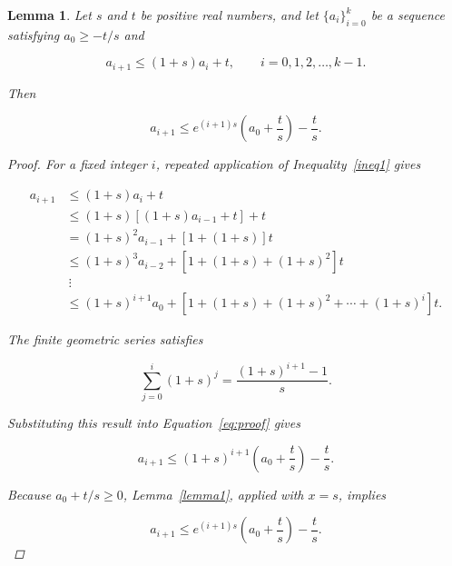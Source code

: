 \documentclass[a4paper]{article}
\newtheorem{lemma}{Lemma}
\begin{document}
\begin{lemma}\label{lemma2}
Let $s$ and $t$ be positive real numbers, and let $\{a_i\}_{i=0}^{k}$ be a sequence satisfying $a_0\geq -t/s$ and

\begin{equation}\label{ineq1}
a_{i+1}\leq (1+s)a_i+t, \qquad i=0,1,2,\ldots,k-1.
\end{equation}

Then

\begin{equation*}
a_{i+1}\leq e^{(i+1)s}\left(a_0+\frac{t}{s}\right)-\frac{t}{s}.
\end{equation*}

\begin{proof}
For a fixed integer $i$, repeated application of Inequality~\ref{ineq1} gives

\begin{equation}\label{eq:proof}
\begin{split}
a_{i+1}
&\leq (1+s)a_i+t\\
&\leq (1+s)[(1+s)a_{i-1}+t]+t\\
&=(1+s)^2a_{i-1}+[1+(1+s)]t\\
&\leq (1+s)^3a_{i-2}+[1+(1+s)+(1+s)^2]t\\
&\ \vdots\\
&\leq (1+s)^{i+1}a_0+[1+(1+s)+(1+s)^2+\cdots+(1+s)^i]t.
\end{split}
\end{equation}

The finite geometric series satisfies

\begin{equation*}
\sum_{j=0}^{i}(1+s)^j=\frac{(1+s)^{i+1}-1}{s}.
\end{equation*}

Substituting this result into Equation~\ref{eq:proof} gives

\begin{equation*}
a_{i+1}\leq (1+s)^{i+1}\left(a_0+\frac{t}{s}\right)-\frac{t}{s}.
\end{equation*}

Because $a_0+t/s\geq 0$, Lemma~\ref{lemma1}, applied with $x=s$, implies

\begin{equation*}
a_{i+1}\leq e^{(i+1)s}\left(a_0+\frac{t}{s}\right)-\frac{t}{s}.
\end{equation*}
\end{proof}
\end{lemma}
\end{document}
